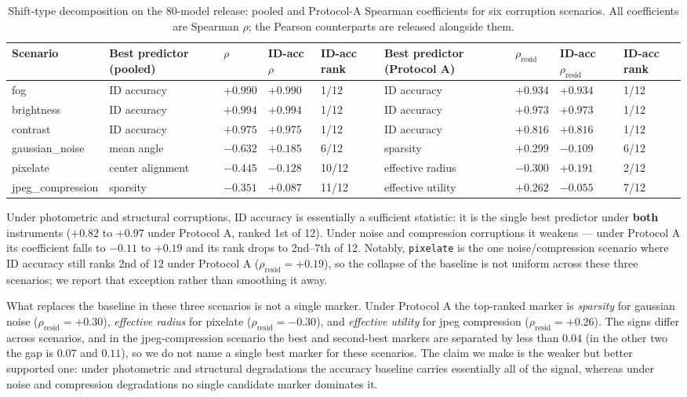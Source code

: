 \documentclass[10pt]{article} %
\begin{document}
\begin{table}[t]
\caption{Shift-type decomposition on the 80-model release: pooled and Protocol-A Spearman coefficients for six corruption scenarios. All coefficients are Spearman $\rho$; the Pearson counterparts are released alongside them.}
\label{tab:shifttype}
\centering
\scriptsize
\setlength{\tabcolsep}{2.5pt}
\begin{tabular}{@{}p{2.10cm}p{1.85cm}p{0.85cm}p{1.15cm}p{0.95cm}p{2.15cm}p{1.25cm}p{1.60cm}p{0.95cm}@{}}
\hline
Scenario & Best predictor (pooled) & $\rho$ & ID-acc $\rho$ & ID-acc rank & Best predictor (Protocol A) & $\rho_{\text{resid}}$ & ID-acc $\rho_{\text{resid}}$ & ID-acc rank \\
\hline
fog & ID accuracy & $+0.990$ & $+0.990$ & 1/12 & ID accuracy & $+0.934$ & $+0.934$ & 1/12 \\
\hline
brightness & ID accuracy & $+0.994$ & $+0.994$ & 1/12 & ID accuracy & $+0.973$ & $+0.973$ & 1/12 \\
\hline
contrast & ID accuracy & $+0.975$ & $+0.975$ & 1/12 & ID accuracy & $+0.816$ & $+0.816$ & 1/12 \\
\hline
gaussian\_\allowbreak noise & mean angle & $-0.632$ & $+0.185$ & 6/12 & sparsity & $+0.299$ & $-0.109$ & 6/12 \\
\hline
pixelate & center alignment & $-0.445$ & $-0.128$ & 10/12 & effective radius & $-0.300$ & $+0.191$ & 2/12 \\
\hline
jpeg\_\allowbreak compression & sparsity & $-0.351$ & $+0.087$ & 11/12 & effective utility & $+0.262$ & $-0.055$ & 7/12 \\
\hline
\end{tabular}
\end{table}

Under photometric and structural corruptions, ID accuracy is essentially a sufficient statistic: it is the single best predictor under \textbf{both} instruments ($+0.82$ to $+0.97$ under Protocol A, ranked 1st of 12). Under noise and compression corruptions it weakens --- under Protocol A its coefficient falls to $-0.11$ to $+0.19$ and its rank drops to 2nd--7th of 12. Notably, \texttt{pixelate} is the one noise/compression scenario where ID accuracy still ranks 2nd of 12 under Protocol A ($\rho_{\text{resid}}=+0.19$), so the collapse of the baseline is not uniform across these three scenarios; we report that exception rather than smoothing it away.

What replaces the baseline in these three scenarios is not a single marker. Under Protocol A the top-ranked marker is \emph{sparsity} for gaussian noise ($\rho_{\text{resid}}=+0.30$), \emph{effective radius} for pixelate ($\rho_{\text{resid}}=-0.30$), and \emph{effective utility} for jpeg compression ($\rho_{\text{resid}}=+0.26$). The signs differ across scenarios, and in the jpeg-compression scenario the best and second-best markers are separated by less than $0.04$ (in the other two the gap is $0.07$ and $0.11$), so we do not name a single best marker for these scenarios. The claim we make is the weaker but better supported one: under photometric and structural degradations the accuracy baseline carries essentially all of the signal, whereas under noise and compression degradations no single candidate marker dominates it.
\end{document}
